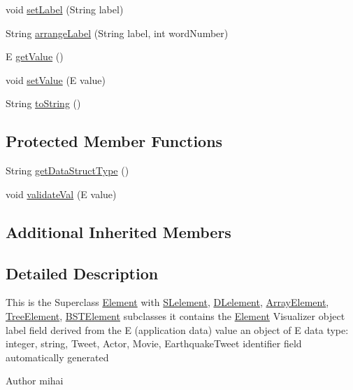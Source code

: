 \begin{DoxyCompactItemize}
\item 
void \hyperlink{classbridges_1_1base_1_1_element_a942ccd766aeca0c4fdbe27ef8cbe78d9}{set\+Label} (String label)
\item 
String \hyperlink{classbridges_1_1base_1_1_element_acd2191242df8a7bf2e8b6ced87880ba6}{arrange\+Label} (String label, int word\+Number)
\item 
E \hyperlink{classbridges_1_1base_1_1_element_a44ddc61db34b6cf0bab7dfba667d54af}{get\+Value} ()
\item 
void \hyperlink{classbridges_1_1base_1_1_element_ab3cf1241da0bc4c59cea9d6f0fd7aaf4}{set\+Value} (E value)
\item 
String \hyperlink{classbridges_1_1base_1_1_element_a7dc685e317fd9dc2e73e049a9f907e42}{to\+String} ()
\end{DoxyCompactItemize}
\subsection*{Protected Member Functions}
\begin{DoxyCompactItemize}
\item 
String \hyperlink{classbridges_1_1base_1_1_element_a6a1b70fa4b1936d10c6deb433acf8cd9}{get\+Data\+Struct\+Type} ()
\item 
void \hyperlink{classbridges_1_1base_1_1_element_af1a60f4e6a91d379179f7d56e6dc3829}{validate\+Val} (E value)
\end{DoxyCompactItemize}
\subsection*{Additional Inherited Members}


\subsection{Detailed Description}
This is the Superclass \hyperlink{classbridges_1_1base_1_1_element}{Element} with \hyperlink{classbridges_1_1base_1_1_s_lelement}{S\+Lelement}, \hyperlink{classbridges_1_1base_1_1_d_lelement}{D\+Lelement}, \hyperlink{classbridges_1_1base_1_1_array_element}{Array\+Element}, \hyperlink{classbridges_1_1base_1_1_tree_element}{Tree\+Element}, \hyperlink{classbridges_1_1base_1_1_b_s_t_element}{B\+S\+T\+Element} subclasses it contains the \hyperlink{classbridges_1_1base_1_1_element}{Element} Visualizer object label field derived from the E (application data) value an object of E data type\+: integer, string, Tweet, Actor, Movie, Earthquake\+Tweet identifier field automatically generated \begin{DoxyAuthor}{Author}
mihai
\end{DoxyAuthor}

